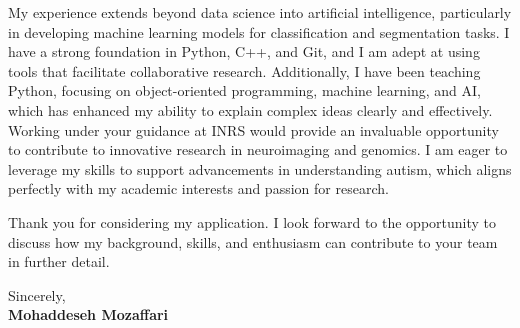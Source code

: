\documentclass[letterpaper,11pt]{letter}
\begin{document}
My experience extends beyond data science into artificial intelligence, particularly in developing machine learning models for classification and segmentation tasks. I have a strong foundation in Python, C++, and Git, and I am adept at using tools that facilitate collaborative research. Additionally, I have been teaching Python, focusing on object-oriented programming, machine learning, and AI, which has enhanced my ability to explain complex ideas clearly and effectively. Working under your guidance at INRS would provide an invaluable opportunity to contribute to innovative research in neuroimaging and genomics. I am eager to leverage my skills to support advancements in understanding autism, which aligns perfectly with my academic interests and passion for research.

Thank you for considering my application. I look forward to the opportunity to discuss how my background, skills, and enthusiasm can contribute to your team in further detail.
\begin{flushleft}
    Sincerely, \\
    \textbf{Mohaddeseh Mozaffari}
\end{flushleft}
\end{document}

